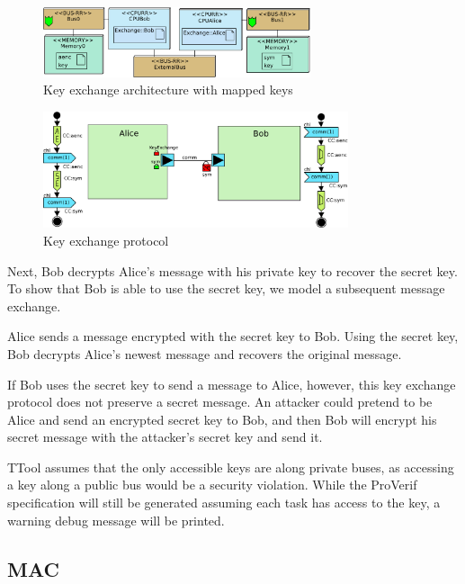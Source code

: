\documentclass{llncs}
\begin{document}
\begin{figure}[htbp]
	\centering
 	\includegraphics[width=0.7\textwidth]{figures/securityStuff/keyArch.pdf}
	\caption{Key exchange architecture with mapped keys}
	\label{fig:keyArch}
\end{figure}


\begin{figure}[htbp]
	\centering
 	\includegraphics[width=0.8\textwidth]{figures/securityStuff/keyComp.pdf}
	\caption{Key exchange protocol}
	\label{fig:keyComp}
\end{figure}

Next, Bob decrypts Alice's message with his private key to recover the secret key. To show that Bob is able to use the
secret key, we model a subsequent message exchange. 

Alice sends a message encrypted with the secret key to Bob. Using the secret key, Bob decrypts Alice's newest message
and recovers the original message. 

If Bob uses the secret key to send a message to Alice, however, this key exchange protocol does not preserve a secret
message. An attacker could pretend to be Alice and send an encrypted secret key to Bob, and then Bob will encrypt his
secret message with the attacker's secret key and send it.


TTool assumes that the only accessible keys are along private buses, as accessing a key along a public bus would be a security violation. While the ProVerif specification will still be generated assuming each task has access to the key, a warning debug message will be printed. 

\subsection{MAC}
\end{document}
